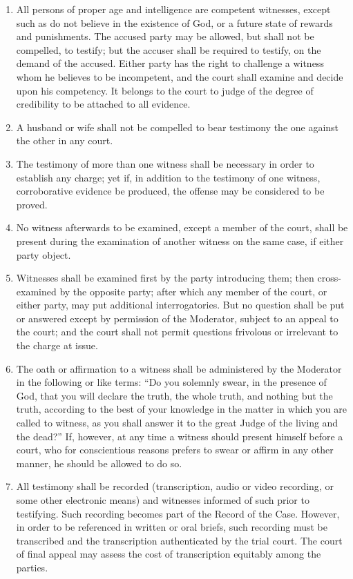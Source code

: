 \documentclass[
]{book}
\providecommand{\tightlist}{%
  \setlength{\itemsep}{0pt}\setlength{\parskip}{0pt}}
\begin{document}
\begin{enumerate}
\def\labelenumi{\arabic{enumi}.}
\tightlist
\item
  \protect\hypertarget{39}{\href{}{}}All persons of proper age and intelligence are competent witnesses, except such as do not believe in the existence of God, or a future state of rewards and punishments. The accused party may be allowed, but shall not be compelled, to testify; but the accuser shall be required to testify, on the demand of the accused. Either party has the right to challenge a witness whom he believes to be incompetent, and the court shall examine and decide upon his competency. It belongs to the court to judge of the degree of credibility to be attached to all evidence.
\item
  A husband or wife shall not be compelled to bear testimony the one against the other in any court.
\item
  The testimony of more than one witness shall be necessary in order to establish any charge; yet if, in addition to the testimony of one witness, corroborative evidence be produced, the offense may be considered to be proved.
\item
  No witness afterwards to be examined, except a member of the court, shall be present during the examination of another witness on the same case, if either party object.
\item
  Witnesses shall be examined first by the party introducing them; then cross-examined by the opposite party; after which any member of the court, or either party, may put additional interrogatories. But no question shall be put or answered except by permission of the Moderator, subject to an appeal to the court; and the court shall not permit questions frivolous or irrelevant to the charge at issue.
\item
  The oath or affirmation to a witness shall be administered by the Moderator in the following or like terms: ``Do you solemnly swear, in the presence of God, that you will declare the truth, the whole truth, and nothing but the truth, according to the best of your knowledge in the matter in which you are called to witness, as you shall answer it to the great Judge of the living and the dead?'' If, however, at any time a witness should present himself before a court, who for conscientious reasons prefers to swear or affirm in any other manner, he should be allowed to do so.
\item
  All testimony shall be recorded (transcription, audio or video recording, or some other electronic means) and witnesses informed of such prior to testifying. Such recording becomes part of the Record of the Case. However, in order to be referenced in written or oral briefs, such recording must be transcribed and the transcription authenticated by the trial court. The court of final appeal may assess the cost of transcription equitably among the parties.

\end{enumerate}
\end{document}
